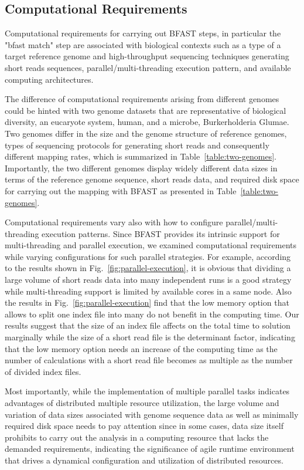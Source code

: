 \documentclass[12pt]{article}
\begin{document}
\subsection{Computational Requirements}

Computational requirements for carrying out BFAST steps, in particular the "bfast match" step are associated with biological contexts such as a type of a target reference genome and high-throughput sequencing techniques generating short reads sequences, parallel/multi-threading execution pattern, and available computing architectures.  

The difference of computational requirements arising from different genomes could be hinted with two genome datasets that are representative of biological diversity, an eucaryote system, human, and a microbe, Burkerholderia Glumae\cite{kim2011}.  Two genomes differ in the size and the genome structure of reference genomes, types of sequencing protocols for generating short reads and consequently different mapping rates, which is summarized in Table~\ref{table:two-genomes}.  Importantly, the two different genomes display widely different data sizes in terms of the reference genome sequence, short reads data, and required disk space for carrying out the mapping with BFAST as presented in Table~\ref{table:two-genomes}. 

Computational requirements vary also with how to configure parallel/multi-threading execution patterns.  Since BFAST provides its intrinsic support for multi-threading and parallel execution, we examined computational requirements while varying configurations for such parallel strategies.  For example, according to the results shown in Fig.~\ref{fig:parallel-execution}, it is obvious that dividing a large volume of short reads data into many independent runs is a good strategy while multi-threading support is limited by available cores in a same node.  Also the results in Fig.~\ref{fig:parallel-execution} find that the low memory option that allows to split one index file into many do not benefit in the computing time. Our results suggest that the size of an index file affects on the total time to solution marginally while the size of a short read file is the determinant factor, indicating that the low memory option needs an increase of the computing time as the number of calculations with a short read file becomes as multiple as the number of divided index files.   

Most importantly, while the implementation of multiple parallel tasks indicates advantages of distributed multiple resource utilization, the large volume and variation of data sizes associated with genome sequence data as well as minimally required disk space needs to pay attention since in some cases, data size itself prohibits to carry out the analysis in a computing resource that lacks the demanded requirements, indicating the significance of agile runtime environment that drives a dynamical configuration and utilization of distributed resources. 
\end{document}
